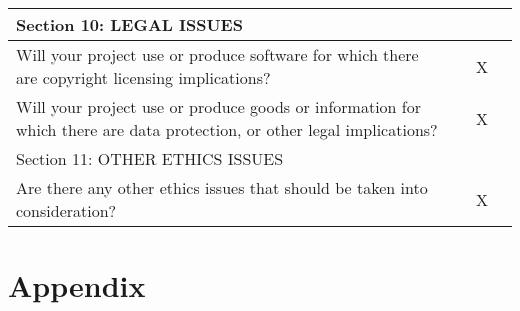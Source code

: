 \begin{tabular}{|p{350pt}|l|c|c|}
    \hline
    Section 10: LEGAL ISSUES &&\\
    \hline
    Will your project use or produce software for which there are copyright licensing implications? &&X\\
    \hline
    Will your project use or produce goods or information for which there are data protection, or other legal implications? &&X\\
    \hline
    Section 11: OTHER ETHICS ISSUES &&\\
    \hline
    Are there any other ethics issues that should be taken into consideration? &&X\\
    \hline
\end{tabular}



\chapter{Appendix}